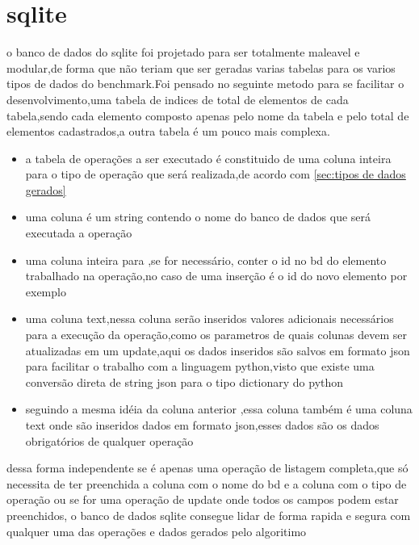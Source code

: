 \documentclass[
	12pt,				%
	openright,			%
	oneside,			%
	a4paper,			%
	english,			%
	french,				%
	spanish,			%
	brazil,				%
	]{abntex2}
\begin{document}
\section{sqlite}
\label{sec:sqlite}
o banco de dados do sqlite foi projetado para ser totalmente maleavel e modular,de forma que não teriam que ser geradas varias tabelas para os varios tipos de dados do benchmark.Foi pensado no seguinte metodo para se facilitar o desenvolvimento,uma tabela de indices de total de elementos de cada tabela,sendo cada elemento composto apenas pelo nome da tabela e pelo total de elementos cadastrados,a outra tabela é um pouco mais complexa.
\begin{itemize}
    \item a tabela de operações a ser executado é constituido de uma coluna inteira para o tipo de operação que será realizada,de acordo com \autoref{sec:tipos de dados gerados} 
    \item uma coluna é um string contendo o nome do banco de dados que será executada a operação
    \item uma coluna inteira para ,se for necessário, conter o id no bd do elemento trabalhado na operação,no caso de uma inserção é o id do novo elemento por exemplo
    \item uma coluna text,nessa coluna serão inseridos valores adicionais necessários para a execução da operação,como os parametros de quais colunas devem ser atualizadas em um update,aqui os dados inseridos são salvos em formato json para facilitar o trabalho com a linguagem python,visto que existe uma conversão direta de string json para o tipo dictionary do python
    \item seguindo a mesma idéia da coluna anterior ,essa coluna também é uma coluna text onde são inseridos dados em formato json,esses dados são os dados obrigatórios de qualquer operação
\end{itemize}
 dessa forma independente se é apenas uma operação de listagem completa,que só necessita de ter preenchida a coluna com o nome do bd e a coluna com o tipo de operação ou se for uma operação de update onde todos os campos podem estar preenchidos, o banco de dados sqlite consegue lidar de forma rapida e segura com qualquer uma das operações e dados gerados pelo algoritimo
\end{document}
